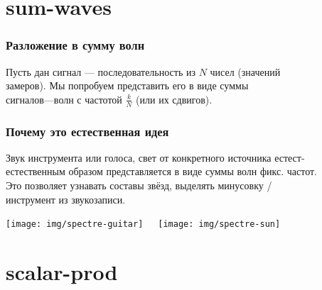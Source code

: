 \documentclass[11pt,aspectratio=169,svgnames]{beamer}
\begin{document}
\section{sum-waves}

\begin{frame} \frametitle{Разложение в сумму волн}
	Пусть дан сигнал — последовательность из \(N\) чисел (значений \\
	замеров). Мы попробуем представить его в виде суммы \\
	сигналов—волн с частотой \(\frac{k}{N}\) (или их сдвигов). \medskip

  \begin{center}  \end{center}
\end{frame}

\begin{frame} \frametitle{Почему это естественная идея}
  Звук инструмента или голоса, свет от конкретного источника естест-\\
  естественным образом представляется в виде суммы волн фикс. частот. \\
  Это позволяет узнавать составы звёзд, выделять минусовку / \\
  инструмент из звукозаписи.

\begin{center}
\texttt{[image: img/spectre-guitar]}\ \ \ 
\texttt{[image: img/spectre-sun]}
\end{center}
\end{frame}

\section{scalar-prod}
\end{document}
